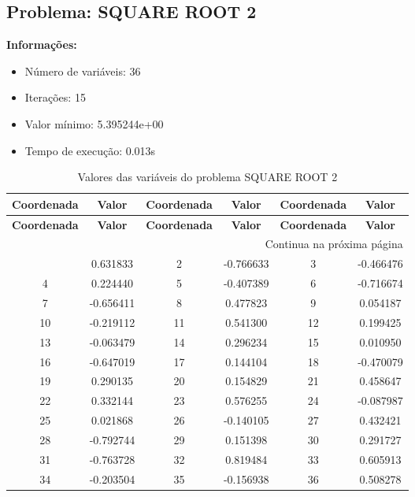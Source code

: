 \documentclass[12pt]{article}
\begin{document}
\newpage            
\subsection{Problema: SQUARE ROOT 2}

\textbf{Informações:}
\begin{itemize}
\item Número de variáveis: 36
\item Iterações: 15
\item Valor mínimo: 5.395244e+00
\item Tempo de execução: 0.013s
\end{itemize}

\small
\begin{longtable}{@{}cc|cc|cc@{}}
\caption{Valores das variáveis do problema SQUARE ROOT 2} \\
\toprule
\textbf{Coordenada} & \textbf{Valor} & \textbf{Coordenada} & \textbf{Valor} & \textbf{Coordenada} & \textbf{Valor} \\
\midrule
\endfirsthead

\toprule
\textbf{Coordenada} & \textbf{Valor} & \textbf{Coordenada} & \textbf{Valor} & \textbf{Coordenada} & \textbf{Valor} \\
\midrule
\endhead

\midrule \multicolumn{6}{r}{{Continua na próxima página}} \\ \midrule
\endfoot

\bottomrule
\endlastfoot
1 & 0.631833 & 2 & -0.766633 & 3 & -0.466476 \\
4 & 0.224440 & 5 & -0.407389 & 6 & -0.716674 \\
7 & -0.656411 & 8 & 0.477823 & 9 & 0.054187 \\
10 & -0.219112 & 11 & 0.541300 & 12 & 0.199425 \\
13 & -0.063479 & 14 & 0.296234 & 15 & 0.010950 \\
16 & -0.647019 & 17 & 0.144104 & 18 & -0.470079 \\
19 & 0.290135 & 20 & 0.154829 & 21 & 0.458647 \\
22 & 0.332144 & 23 & 0.576255 & 24 & -0.087987 \\
25 & 0.021868 & 26 & -0.140105 & 27 & 0.432421 \\
28 & -0.792744 & 29 & 0.151398 & 30 & 0.291727 \\
31 & -0.763728 & 32 & 0.819484 & 33 & 0.605913 \\
34 & -0.203504 & 35 & -0.156938 & 36 & 0.508278 \\

\end{longtable}
\end{document}
